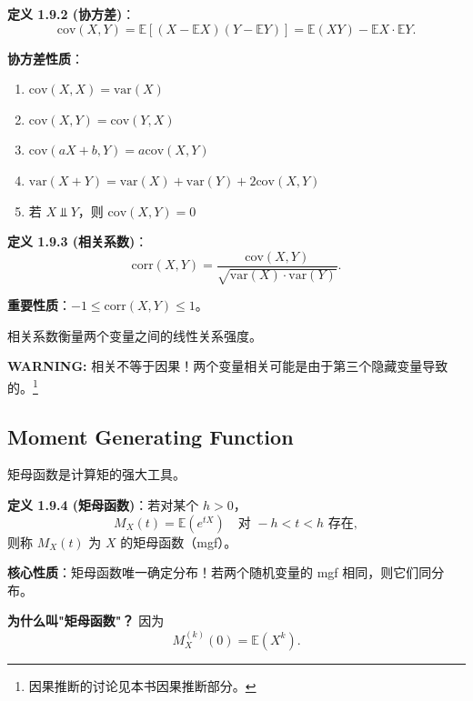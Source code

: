 \begin{remark}
\textbf{定义 1.9.2 (协方差)}：
\[
\text{cov}(X, Y) = \mathbb{E}[(X - \mathbb{E}X)(Y - \mathbb{E}Y)] = \mathbb{E}(XY) - \mathbb{E}X \cdot \mathbb{E}Y.
\tag{1.9.1}\label{eq:covariance-def-ch1}
\]

\textbf{协方差性质}：
\begin{enumerate}
    \item $\text{cov}(X, X) = \text{var}(X)$
    \item $\text{cov}(X, Y) = \text{cov}(Y, X)$
    \item $\text{cov}(aX + b, Y) = a \text{cov}(X, Y)$
    \item $\text{var}(X + Y) = \text{var}(X) + \text{var}(Y) + 2\text{cov}(X, Y)$
    \item 若 $X \Perp Y$，则 $\text{cov}(X, Y) = 0$
\end{enumerate}
\end{remark}

\begin{remark}
\textbf{定义 1.9.3 (相关系数)}：
\[
\text{corr}(X, Y) = \frac{\text{cov}(X, Y)}{\sqrt{\text{var}(X) \cdot \text{var}(Y)}}.
\tag{1.9.2}\label{eq:correlation-def-ch1}
\]

\textbf{重要性质}：$-1 \leq \text{corr}(X, Y) \leq 1$。

相关系数衡量两个变量之间的线性关系强度。
\end{remark}

\textbf{WARNING:} 相关不等于因果！两个变量相关可能是由于第三个隐藏变量导致的。\footnote{因果推断的讨论见本书因果推断部分。}

\subsection{Moment Generating Function}

矩母函数是计算矩的强大工具。

\begin{remark}
\textbf{定义 1.9.4 (矩母函数)}：若对某个 $h > 0$，
\[
M_X(t) = \mathbb{E}(e^{tX}) \quad \text{对 } -h < t < h \text{ 存在},
\tag{1.9.3}\label{eq:mgf-def-ch1}
\]
则称 $M_X(t)$ 为 $X$ 的矩母函数（mgf）。
\end{remark}

\textbf{核心性质}：矩母函数唯一确定分布！若两个随机变量的 mgf 相同，则它们同分布。

\textbf{为什么叫"矩母函数"？} 因为
\[
M_X^{(k)}(0) = \mathbb{E}(X^k).
\tag{1.9.4}\label{eq:mgf-moments-ch1}
\]

